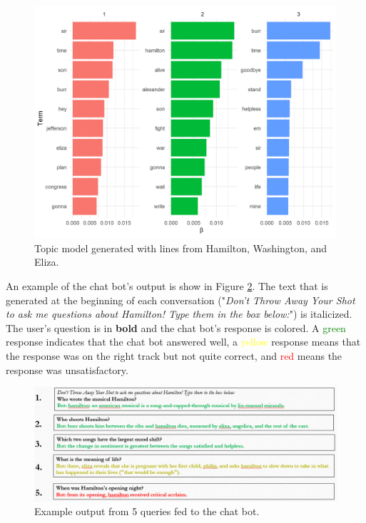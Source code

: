 \documentclass{article}
\begin{document}
\begin{figure}[h]
    \caption{Topic model generated with lines from Hamilton, Washington, and Eliza. \label{fig:topic_model}}
    \centering
    \includegraphics[width=0.7\paperwidth]{topic_model.png}
\end{figure}

An example of the chat bot's output is show in Figure \ref{fig:chat_bot}. The text that is generated at the beginning of each conversation ("\emph{Don't Throw Away Your Shot to ask me questions about Hamilton! Type them in the box below:}") is italicized. The user's question is in \textbf{bold} and the chat bot's response is colored. A \textcolor{green}{green} response indicates that the chat bot answered well, a \textcolor{yellow}{yellow} response means that the response was on the right track but not quite correct, and \textcolor{red}{red} means the response was unsatisfactory. 

\begin{figure}[h]
    \caption{Example output from 5 queries fed to the chat bot. \label{fig:chat_bot}}
    \centering
    \includegraphics[width=0.7\paperwidth]{chat_bot_output.png}
\end{figure}
\end{document}
